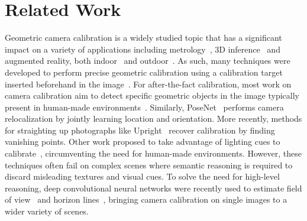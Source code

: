 
\section{Related Work}







Geometric camera calibration is a widely studied topic that has a significant impact on a variety of applications including metrology~\cite{Criminisi2000}, 3D inference~\cite{Criminisi00,Fouhey2013} and augmented reality, both indoor~\cite{hedau-iccv-09,izadinia-cvpr-17} and outdoor~\cite{hoiem-cvpr-06}. As such, many techniques were developed to perform precise geometric calibration using a calibration target inserted beforehand in the image~\cite{Sturm1999,Zhang2002,Heikkila1997,Chen2004}. For after-the-fact calibration, most work on camera calibration aim to detect specific geometric objects in the image typically present in human-made environments~\cite{Rother2000,Melo2013}. Similarly, PoseNet~\cite{kendall-iccv-15} performs camera relocalization by jointly learning location and orientation. More recently, methods for straighting up photographs like Upright~\cite{Lee2014} recover calibration by finding vanishing points. Other work proposed to take advantage of lighting cues to calibrate~\cite{Lalonde2010,Workman2014}, circumventing the need for human-made environments. However, these techniques often fail on complex scenes where semantic reasoning is required to discard misleading textures and visual cues. To solve the need for high-level reasoning, deep convolutional neural networks were recently used to estimate field of view~\cite{Workman2015a} and horizon lines~\cite{Workman2016}, bringing camera calibration on single images to a wider variety of scenes.

